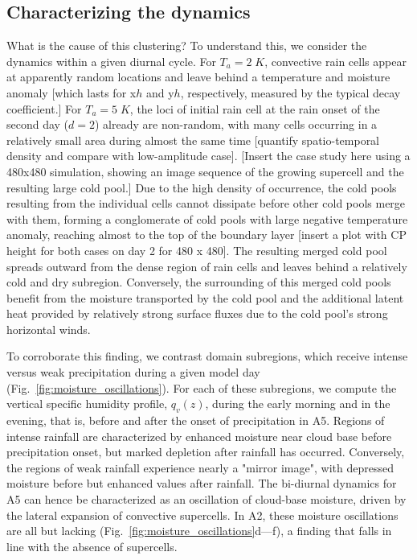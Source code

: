 \documentclass[draft,linenumbers]{agujournal2019}
\begin{document}
\subsection{Characterizing the dynamics}
What is the cause of this clustering?
To understand this, we consider the dynamics within a given diurnal cycle.
For $T_a=2\;K$, convective rain cells appear at apparently random locations and leave behind a temperature and moisture anomaly [which lasts for x$h$ and y$h$, respectively, measured by the typical decay coefficient.]
For $T_a=5\;K$, the loci of initial rain cell at the rain onset of the second day ($d=2$) already are non-random, with many cells occurring in a relatively small area during almost the same time [quantify spatio-temporal density and compare with low-amplitude case].
[Insert the case study here using a 480x480 simulation, showing an image sequence of the growing supercell and the resulting large cold pool.]
Due to the high density of occurrence, the cold pools resulting from the individual cells cannot dissipate before other cold pools merge with them, forming a conglomerate of cold pools with large negative temperature anomaly, reaching almost to the top of the boundary layer [insert a plot with CP height for both cases on day 2 for 480 x 480].
The resulting merged cold pool spreads outward from the dense region of rain cells and leaves behind a relatively cold and dry subregion.
Conversely, the surrounding of this merged cold pools benefit from the moisture transported by the cold pool and the additional latent heat provided by relatively strong surface fluxes due to the cold pool's strong horizontal winds.

To corroborate this finding, we contrast domain subregions, which receive intense versus weak precipitation during a given model day (Fig.~\ref{fig:moisture_oscillations}).
For each of these subregions, we compute the vertical specific humidity profile, $q_v(z)$, during the early morning and in the evening, that is, before and after the onset of precipitation in A5.
Regions of intense rainfall are characterized by enhanced moisture near cloud base before precipitation onset, but marked depletion after rainfall has occurred.
Conversely, the regions of weak rainfall experience nearly a "mirror image", with depressed moisture before but enhanced values after rainfall.
The bi-diurnal dynamics for A5 can hence be characterized as an oscillation of cloud-base moisture, driven by the lateral expansion of convective supercells.
In A2, these moisture oscillations are all but lacking (Fig.~\ref{fig:moisture_oscillations}d---f), a finding that falls in line with the absence of supercells.
\end{document}

